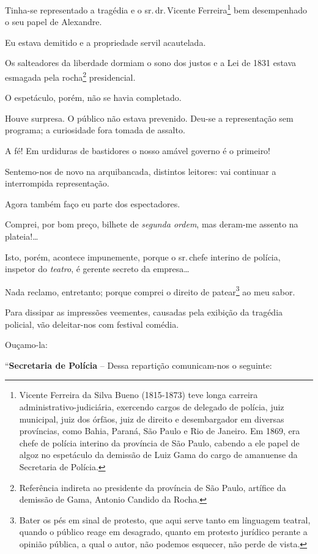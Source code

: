 Tinha-se representado a tragédia e o sr.\,dr.\,Vicente Ferreira\footnote{
  Vicente Ferreira da Silva Bueno (1815-1873) teve longa carreira
  administrativo-judiciária, exercendo cargos de delegado de polícia,
  juiz municipal, juiz dos órfãos, juiz de direito e desembargador em
  diversas províncias, como Bahia, Paraná, São Paulo e Rio de Janeiro.
  Em 1869, era chefe de polícia interino da província de São Paulo,
  cabendo a ele papel de algoz no espetáculo da demissão de Luiz Gama do
  cargo de amanuense da Secretaria de Polícia.} bem desempenhado o seu
papel de Alexandre.

Eu estava demitido e a propriedade servil acautelada.

Os salteadores da liberdade dormiam o sono dos justos e a Lei de 1831
estava esmagada pela rocha\footnote{Referência indireta ao presidente
  da província de São Paulo, artífice da demissão de Gama, Antonio
  Candido da Rocha.} presidencial.

O espetáculo, porém, não se havia completado.

Houve surpresa. O público não estava prevenido. Deu-se a representação
sem programa; a curiosidade fora tomada de assalto.

A fé! Em urdiduras de bastidores o nosso amável governo é o primeiro!

Sentemo-nos de novo na arquibancada, distintos leitores: vai continuar a
interrompida representação.

Agora também faço eu parte dos espectadores.

Comprei, por bom preço, bilhete de \emph{segunda ordem}, mas deram-me
assento na plateia!\ldots{}

Isto, porém, acontece impunemente, porque o sr.\,chefe interino de
polícia, inspetor do \emph{teatro}, é gerente secreto da empresa\ldots{}

Nada reclamo, entretanto; porque comprei o direito de patear\footnote{
  Bater os pés em sinal de protesto, que aqui serve tanto em linguagem
  teatral, quando o público reage em desagrado, quanto em protesto
  jurídico perante a opinião pública, a qual o autor, não podemos
  esquecer, não perde de vista.} ao meu sabor.

Para dissipar as impressões veementes, causadas pela exibição da
tragédia policial, vão deleitar-nos com festival comédia.

Ouçamo-la:

``\textbf{Secretaria de Polícia} -- Dessa repartição comunicam-nos o
seguinte:

